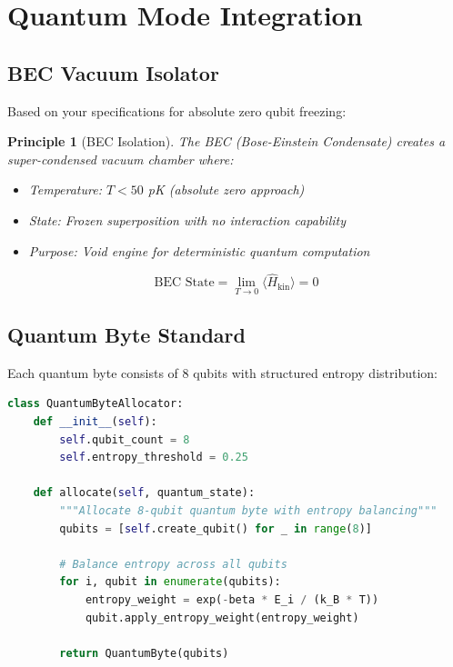 \documentclass[12pt]{article}
\newtheorem{principle}{Principle}
\begin{document}
\section{Quantum Mode Integration}

\subsection{BEC Vacuum Isolator}
Based on your specifications for absolute zero qubit freezing:

\begin{principle}[BEC Isolation]
The BEC (Bose-Einstein Condensate) creates a super-condensed vacuum chamber where:
\begin{itemize}
\item Temperature: $T < 50$ pK (absolute zero approach)
\item State: Frozen superposition with no interaction capability
\item Purpose: Void engine for deterministic quantum computation
\end{itemize}
\end{principle}

\begin{equation}
\boxed{
\text{BEC State} = \lim_{T \to 0} \langle \hat{H}_{\text{kin}} \rangle = 0
}
\end{equation}

\subsection{Quantum Byte Standard}
Each quantum byte consists of 8 qubits with structured entropy distribution:

\begin{lstlisting}[language=Python, caption=Quantum Byte Allocator]
class QuantumByteAllocator:
    def __init__(self):
        self.qubit_count = 8
        self.entropy_threshold = 0.25
        
    def allocate(self, quantum_state):
        """Allocate 8-qubit quantum byte with entropy balancing"""
        qubits = [self.create_qubit() for _ in range(8)]
        
        # Balance entropy across all qubits
        for i, qubit in enumerate(qubits):
            entropy_weight = exp(-beta * E_i / (k_B * T))
            qubit.apply_entropy_weight(entropy_weight)
            
        return QuantumByte(qubits)
\end{lstlisting}
\end{document}
